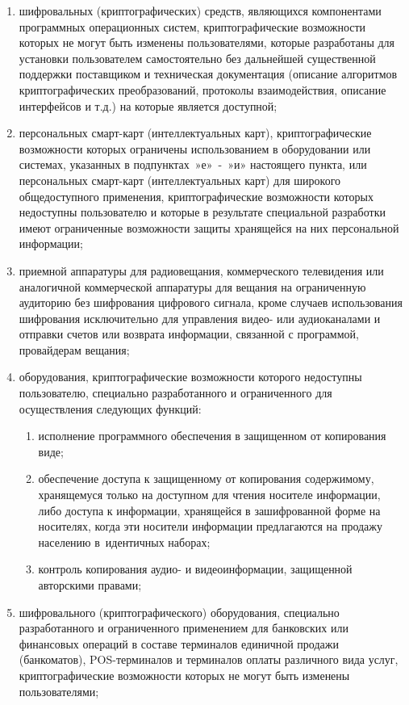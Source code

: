 {\begin{enumerate}
\item шифровальных (криптографических) средств, являющихся компонентами программных операционных систем, криптографические возможности которых не могут быть изменены пользователями, которые разработаны для установки пользователем самостоятельно без дальнейшей существенной поддержки поставщиком и техническая документация (описание алгоритмов криптографических преобразований, протоколы взаимодействия, описание интерфейсов и т.д.) на которые является доступной;
\item персональных смарт-карт (интеллектуальных карт), криптографические возможности которых ограничены использованием в оборудовании или системах, указанных в подпунктах »е» - »и» настоящего пункта, или персональных смарт-карт (интеллектуальных карт) для широкого общедоступного применения, криптографические возможности которых недоступны пользователю и которые в результате специальной разработки имеют ограниченные возможности защиты хранящейся на них персональной информации;
\item приемной аппаратуры для радиовещания, коммерческого телевидения или аналогичной коммерческой аппаратуры для вещания на ограниченную аудиторию без шифрования цифрового сигнала, кроме случаев использования шифрования исключительно для управления видео- или аудиоканалами и отправки счетов или возврата информации, связанной с программой, провайдерам вещания;
\item оборудования, криптографические возможности которого недоступны пользователю, специально разработанного и ограниченного для осуществления следующих функций:
    \begin{enumerate}
    \item исполнение программного обеспечения в защищенном от копирования виде;
    \item обеспечение доступа к защищенному от копирования содержимому, хранящемуся только на доступном для чтения носителе информации, либо доступа к информации, хранящейся в зашифрованной форме на носителях, когда эти носители информации предлагаются на продажу населению в идентичных наборах;
    \item контроль копирования аудио- и видеоинформации, защищенной авторскими правами;
    \end{enumerate}
\item шифровального (криптографического) оборудования, специально разработанного и ограниченного применением для банковских или финансовых операций в составе терминалов единичной продажи (банкоматов), POS-терминалов и терминалов оплаты различного вида услуг, криптографические возможности которых не могут быть изменены пользователями;

\end{enumerate}}
